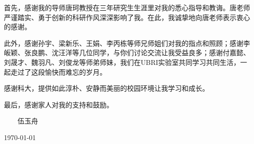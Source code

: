 ﻿
\begin{thanks}

首先，感谢我的导师唐珂教授在三年研究生生涯里对我的悉心指导和教诲。唐老师严谨踏实、勇于创新的科研作风深深影响了我。在此，我诚挚地向唐老师表示衷心的感谢。

此外，感谢孙宇、梁新乐、王娟、李丙栋等师兄师姐们对我的指点和照顾；感谢李皈颖、张良鹏、沈汪洋等几位同学，与你们讨论交流让我受益良多；感谢付嘉懿、刘晟才、魏羽凡、刘俊龙等师弟师妹，我们在UBRI实验室共同学习共同生活，一起走过了这段愉快而难忘的岁月。

感谢科大，提供如此淳朴、安静而美丽的校园环境让我学习和成长。

最后，感谢家人对我的支持和鼓励。

\vskip 18pt

\begin{flushright}

~~~~伍玉舟~~~~

\today

\end{flushright}

\end{thanks}
